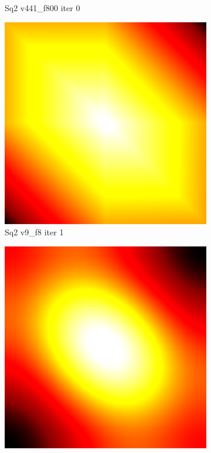 \begin{figure}[ht]
{\begin{subfigure}[b]{0.48\linewidth}
		\caption{Sq2 v441\_f800 iter 0}\label{fig:sq2.d}
	\end{subfigure}

	\bigskip
	\begin{subfigure}[b]{0.48\linewidth}
		\includegraphics[width=1.0\linewidth,height=0.32\textheight,keepaspectratio]{data/synthetic_meshes/square_tesselation_2tri_Dirac_delta_1_v9_f8_funcvals_1iter_crop.png}
		\caption{Sq2 v9\_f8 iter 1}\label{fig:sq2.e}
	\end{subfigure}
	\begin{subfigure}[b]{0.48\linewidth}
		\includegraphics[width=1.0\linewidth,height=0.32\textheight,keepaspectratio]{data/synthetic_meshes/square_tessellation_2tri_Dirac_delta_10_v441_f800_funcvals_100iter.png}

\end{subfigure}}
\end{figure}
